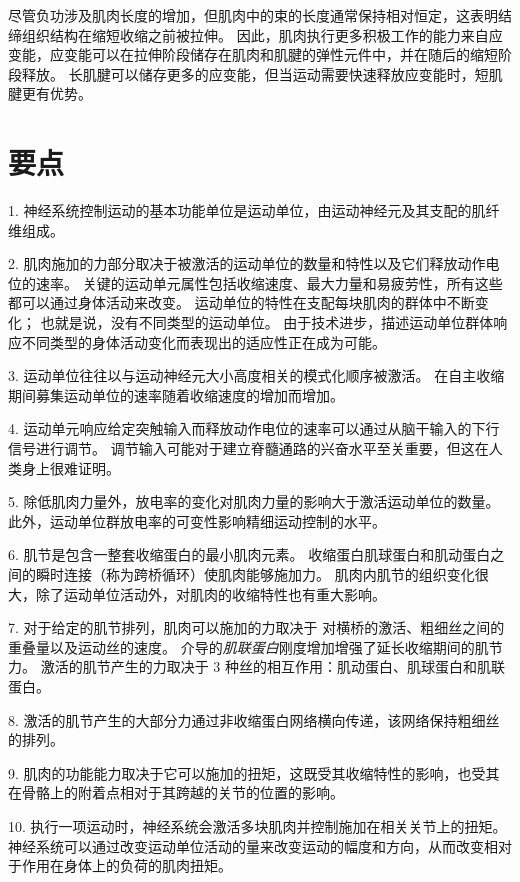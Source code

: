 尽管负功涉及肌肉长度的增加，但肌肉中的束的长度通常保持相对恒定，这表明结缔组织结构在缩短收缩之前被拉伸。
因此，肌肉执行更多积极工作的能力来自应变能，应变能可以在拉伸阶段储存在肌肉和肌腱的弹性元件中，并在随后的缩短阶段释放。
长肌腱可以储存更多的应变能，但当运动需要快速释放应变能时，短肌腱更有优势。



\section{要点}

1. 神经系统控制运动的基本功能单位是运动单位，由运动神经元及其支配的肌纤维组成。 


2. 肌肉施加的力部分取决于被激活的运动单位的数量和特性以及它们释放动作电位的速率。
关键的运动单元属性包括收缩速度、最大力量和易疲劳性，所有这些都可以通过身体活动来改变。
运动单位的特性在支配每块肌肉的群体中不断变化；
也就是说，没有不同类型的运动单位。
由于技术进步，描述运动单位群体响应不同类型的身体活动变化而表现出的适应性正在成为可能。


3. 运动单位往往以与运动神经元大小高度相关的模式化顺序被激活。
在自主收缩期间募集运动单位的速率随着收缩速度的增加而增加。


4. 运动单元响应给定突触输入而释放动作电位的速率可以通过从脑干输入的下行信号进行调节。
调节输入可能对于建立脊髓通路的兴奋水平至关重要，但这在人类身上很难证明。


5. 除低肌肉力量外，放电率的变化对肌肉力量的影响大于激活运动单位的数量。
此外，运动单位群放电率的可变性影响精细运动控制的水平。


6. 肌节是包含一整套收缩蛋白的最小肌肉元素。
收缩蛋白肌球蛋白和肌动蛋白之间的瞬时连接（称为跨桥循环）使肌肉能够施加力。
肌肉内肌节的组织变化很大，除了运动单位活动外，对肌肉的收缩特性也有重大影响。


7. 对于给定的肌节排列，肌肉可以施加的力取决于  对横桥的激活、粗细丝之间的重叠量以及运动丝的速度。
 介导的\textit{肌联蛋白}刚度增加增强了延长收缩期间的肌节力。
激活的肌节产生的力取决于 3 种丝的相互作用：肌动蛋白、肌球蛋白和肌联蛋白。


8. 激活的肌节产生的大部分力通过非收缩蛋白网络横向传递，该网络保持粗细丝的排列。


9. 肌肉的功能能力取决于它可以施加的扭矩，这既受其收缩特性的影响，也受其在骨骼上的附着点相对于其跨越的关节的位置的影响。


10. 执行一项运动时，神经系统会激活多块肌肉并控制施加在相关关节上的扭矩。
神经系统可以通过改变运动单位活动的量来改变运动的幅度和方向，从而改变相对于作用在身体上的负荷的肌肉扭矩。



